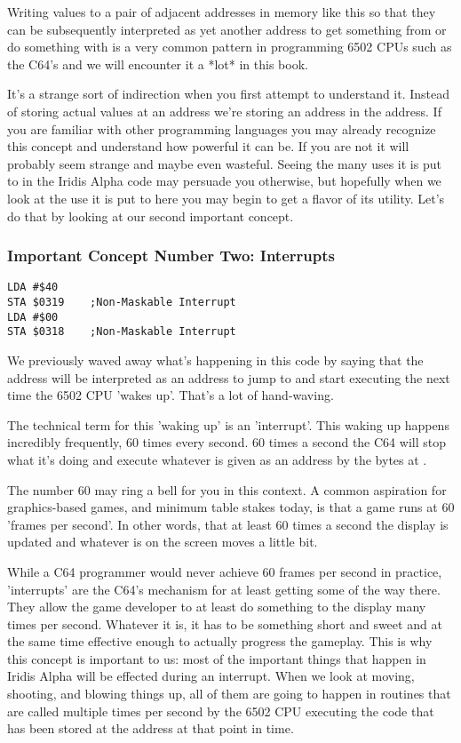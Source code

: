 Writing values to a pair of adjacent addresses in memory like this so that they can
be subsequently interpreted as yet another address to get something from or do something with is a very common
pattern in programming 6502 CPUs such as the C64's and we will encounter it a *lot* in this book.

It's a strange sort of indirection when you first attempt to understand it. Instead of storing actual values
at an address we're storing an address in the address. If you are familiar with other programming languages
you may already recognize this concept and understand how powerful it can be. If you are not it will probably
seem strange and maybe even wasteful. Seeing the many uses it is put to in the Iridis Alpha code may persuade
you otherwise, but hopefully when we look at the use it is put to here you may begin to get a flavor of its
utility. Let's do that by looking at our second important concept.

\subsubsection{Important Concept Number Two: Interrupts}
\begin{lstlisting}[caption=It's an interrupt. And it's non-maskable.]
LDA #$40
STA $0319    ;Non-Maskable Interrupt
LDA #$00
STA $0318    ;Non-Maskable Interrupt
\end{lstlisting}

We previously waved away what's happening in this code by saying that the address  will be interpreted
as an address to jump to and start executing the next time the 6502 CPU 'wakes up'. That's a lot of hand-waving.

The technical term for this 'waking up' is an 'interrupt'. This waking up happens incredibly frequently, 60 times every second.
60 times a second the C64 will stop what it's doing and execute whatever is given as an address by the bytes at .

The number 60 may ring a bell for you in this context. A common aspiration for graphics-based games, and minimum table stakes today,
is that a game runs at 60 'frames per second'. In other words, that at least 60 times a second the display is updated and whatever
is on the screen moves a little bit.

While a C64 programmer would never achieve 60 frames per second in practice, 'interrupts' are the C64's mechanism for at least
getting some of the way there. They allow the game developer to at least do something to the display many times per second.
Whatever it is, it has to be something short and sweet and at the same time effective enough to actually progress the gameplay.
This is why this concept is important to us: most of the important things that happen in Iridis Alpha will be effected during
an interrupt. When we look at moving, shooting, and blowing things up, all of them are going to happen in routines that are called
multiple times per second by the 6502 CPU executing the code that has been stored at the address  at that
point in time.

